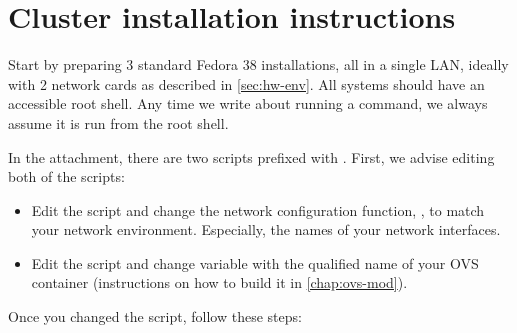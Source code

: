 \chapter{Cluster installation instructions}
\label{chap:install}

Start by preparing 3 standard Fedora 38 installations, all in a single LAN, ideally with 2 network cards as described in \cref{sec:hw-env}. All systems should have an accessible root shell. Any time we write about running a command, we always assume it is run from the root shell.

In the attachment, there are two scripts prefixed with . First, we advise editing both of the scripts:

\begin{itemize}
    \item Edit the  script and change the network configuration function, , to match your network environment. Especially, the names of your network interfaces.

    \item Edit the  script and change  variable with the qualified name of your OVS container (instructions on how to build it in \cref{chap:ovs-mod}).
\end{itemize}

Once you changed the script, follow these steps:

